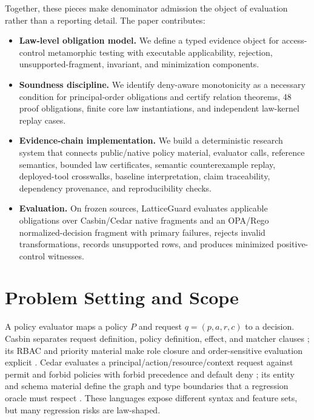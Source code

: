 \documentclass[10pt,conference]{IEEEtran}
\begin{document}
Together, these pieces make denominator admission the object of evaluation rather than a reporting detail.  The paper contributes:
\begin{itemize}
\item \textbf{Law-level obligation model.} We define a typed evidence object for access-control metamorphic testing with executable applicability, rejection, unsupported-fragment, invariant, and minimization components.
\item \textbf{Soundness discipline.} We identify deny-aware monotonicity as a necessary condition for principal-order obligations and certify \LGRelations{} relation theorems, 48 proof obligations, \LGModelCheckCases{} finite core law instantiations, and \LGMechanizedKernelCases{} independent law-kernel replay cases.
\item \textbf{Evidence-chain implementation.} We build a deterministic research system that connects public/native policy material, evaluator calls, reference semantics, bounded law certificates, semantic counterexample replay, deployed-tool crosswalks, baseline interpretation, claim traceability, dependency provenance, and reproducibility checks.
\item \textbf{Evaluation.} On \LGSources{} frozen sources, LatticeGuard evaluates \LGPrimaryObligations{} applicable obligations over Casbin/Cedar native fragments and an OPA/Rego normalized-decision fragment with \LGPrimaryFailures{} primary failures, rejects \LGRejected{} invalid transformations, records \LGUnsupported{} unsupported rows, and produces \LGCounterexamples{} minimized positive-control witnesses.
\end{itemize}

\section{Problem Setting and Scope}
\label{sec:problem}
A policy evaluator maps a policy $P$ and request $q=(p,a,r,c)$ to a decision.  Casbin separates request definition, policy definition, effect, and matcher clauses \cite{casbin_model_docs}; its RBAC and priority material make role closure and order-sensitive evaluation explicit \cite{casbin_rbac_docs} \cite{casbin_priority_docs}.  Cedar evaluates a principal/action/resource/context request against permit and forbid policies with forbid precedence and default deny \cite{cedar_authz_docs}; its entity and schema material define the graph and type boundaries that a regression oracle must respect \cite{cedar_entities_docs} \cite{cedar_schema_docs}.  These languages expose different syntax and feature sets, but many regression risks are law-shaped.
\end{document}
